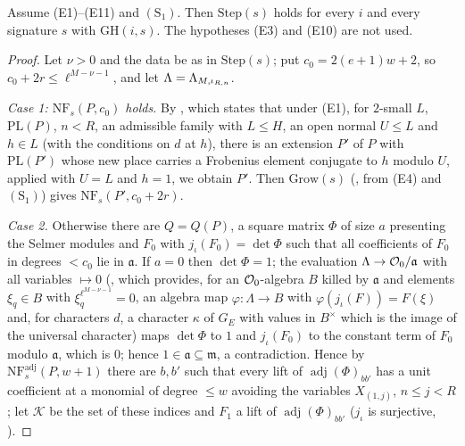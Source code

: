 \begin{lemma}\label{pf:baselat1:newprime}
Assume (E1)--(E11) and $(\mathrm{S}_1)$. Then $\mathrm{Step}(s)$ holds for every $i$ and every signature $s$ with
$\mathrm{GH}(i,s)$. The hypotheses (E3) and (E10) are not used.
\end{lemma}

\begin{proof}
Let $\nu>0$ and the data be as in $\mathrm{Step}(s)$; put $c_0=2(e+1)w+2$, so $c_0+2r\le\ell^{M-\nu-1}$, and let
$\Lambda=\Lambda_{M,\iota_{R,n}}$.

\emph{Case 1: $\mathrm{NF}_s(P,c_0)$ holds.} By
, which states that under (E1), for
$2$-small $L$, $\mathrm{PL}(P)$, $n<R$, an admissible family with $L\le H$, an open normal $U\le L$ and $h\in L$ (with the
conditions on $d$ at $h$), there is an extension $P'$ of $P$ with $\mathrm{PL}(P')$ whose new place carries a Frobenius element
conjugate to $h$ modulo $U$, applied with $U=L$ and $h=1$, we obtain $P'$. Then $\mathrm{Grow}(s)$
(, from (E4) and $(\mathrm{S}_1)$) gives
$\mathrm{NF}_s(P',c_0+2r)$.

\emph{Case 2.} Otherwise there are $Q=Q(P)$, a square matrix $\Phi$ of size $a$ presenting the Selmer modules and $F_0$ with
$j_\iota(F_0)=\det\Phi$ such that all coefficients of $F_0$ in degrees $<c_0$ lie in $\mathfrak a$. If $a=0$ then
$\det\Phi=1$; the evaluation $\Lambda\to\mathcal O_0/\mathfrak a$ with all variables $\mapsto0$
(, which provides, for an $\mathcal O_0$-algebra $B$ killed by
$\mathfrak a$ and elements $\xi_q\in B$ with $\xi_q^{\ell^{M-\nu-1}}=0$, an algebra map $\varphi\colon\Lambda\to B$ with
$\varphi(j_\iota(F))=F(\xi)$ and, for characters $d$, a character $\kappa$ of $G_E$ with values in $B^\times$ which is the image of the
universal character) maps $\det\Phi$ to $1$ and $j_\iota(F_0)$ to the constant term of $F_0$ modulo $\mathfrak a$, which is $0$;
hence $1\in\mathfrak a\subseteq\mathfrak m$, a contradiction. Hence by $\mathrm{NF}^{\mathrm{adj}}_s(P,w+1)$ there are $b,b'$ such that every lift of
$\operatorname{adj}(\Phi)_{bb'}$ has a unit coefficient at a monomial of degree $\le w$ avoiding the variables $X_{(1,j)}$, $n\le j<R$;
let $\mathcal K$ be the set of these indices and $F_1$ a lift of $\operatorname{adj}(\Phi)_{bb'}$ ($j_\iota$ is surjective,
).


\end{proof}
